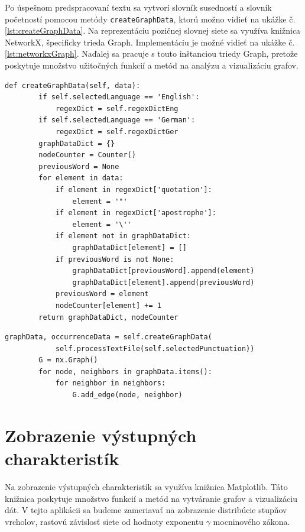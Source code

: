 Po úspešnom predspracovaní textu sa vytvorí slovník susedností a slovník početností pomocou metódy \texttt{createGraphData}, ktorú
možno vidieť na ukážke č. \ref{lst:createGraphData}. Na reprezentáciu pozičnej slovnej siete sa využíva knižnica NetworkX, špecificky
trieda Graph. Implementáciu je možné vidieť na ukážke č. \ref{lst:networkxGraph}. Naďalej sa pracuje s touto inštanciou triedy Graph,
pretože poskytuje množstvo užitočných funkcií a metód na analýzu a vizualizáciu grafov.

\clearpage

\begin{lstlisting}[caption={Metóda pre vytvorenie pozičnej slovnej siete z predspracovaného textu.}, label={lst:createGraphData}]
    def createGraphData(self, data):
        if self.selectedLanguage == 'English':
            regexDict = self.regexDictEng
        if self.selectedLanguage == 'German':
            regexDict = self.regexDictGer
        graphDataDict = {}
        nodeCounter = Counter()
        previousWord = None
        for element in data:
            if element in regexDict['quotation']:
                element = '"'
            if element in regexDict['apostrophe']:
                element = '\''
            if element not in graphDataDict:
                graphDataDict[element] = []
            if previousWord is not None:
                graphDataDict[previousWord].append(element)
                graphDataDict[element].append(previousWord)
            previousWord = element
            nodeCounter[element] += 1
        return graphDataDict, nodeCounter
\end{lstlisting}

\begin{lstlisting}[caption={Vytvorenie inštancie triedy NetworkX.Graph.}, label={lst:networkxGraph}]
    graphData, occurrenceData = self.createGraphData(
            self.processTextFile(self.selectedPunctuation))
        G = nx.Graph()
        for node, neighbors in graphData.items():
            for neighbor in neighbors:
                G.add_edge(node, neighbor)
\end{lstlisting}

\section{Zobrazenie výstupných charakteristík}\label{sec:graphicalOutput}

Na zobrazenie výstupných charakteristík sa využíva knižnica Matplotlib. Táto knižnica poskytuje množstvo funkcií
a metód na vytváranie grafov a vizualizáciu dát. V tejto aplikácii sa budeme zameriavať na zobrazenie distribúcie stupňov
vrcholov, rastovú závislosť siete od hodnoty exponentu $\gamma$ mocninového zákona.

